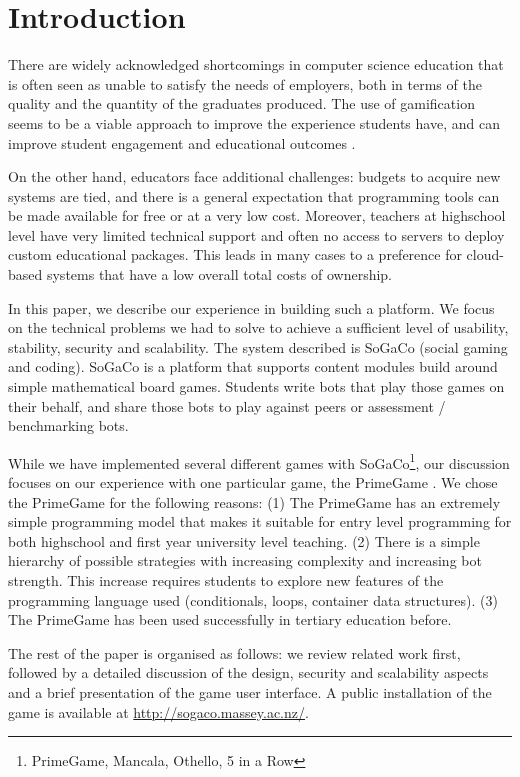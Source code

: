 \section{Introduction}


There are widely acknowledged shortcomings in computer science education that is often seen as unable to satisfy the needs of employers, both in terms of the quality and the quantity of the graduates produced. The use of gamification seems to be a viable approach to improve the experience students have, and can improve student engagement and educational outcomes \cite{muratet2009towards,rankin2008impact,wang2009application}.

On the other hand, educators face additional challenges: budgets to acquire new systems are tied, and there is a general expectation that programming tools can be made available for free or at a very low cost. Moreover, teachers at highschool level have very limited technical support and often no access to servers to deploy custom educational packages. This leads in many cases to a preference for cloud-based systems that have a low overall total costs of ownership.

In this paper,
we describe our experience in building such a platform. We focus on the technical problems we had to solve to achieve a sufficient level of usability, stability, security and scalability. The system described is SoGaCo (social gaming and coding). SoGaCo is a platform that supports content modules build around simple mathematical board games. Students write bots that play those games on their behalf, and share those bots to play against peers or assessment / benchmarking bots.

While we have implemented several different games with SoGaCo\footnote{PrimeGame, Mancala, Othello, 5 in a Row}, our discussion focuses on our experience with one particular game, the PrimeGame \cite{meyer2010primegame,meyer2011primegame}. We chose the PrimeGame for the following reasons: (1) The PrimeGame has an extremely simple programming model that makes it suitable for entry level programming for both highschool and first year university level teaching. (2) There is a simple hierarchy of possible strategies with increasing complexity and increasing bot strength. This increase requires students to explore new features of the programming language used (conditionals, loops, container data structures). (3) The PrimeGame has been used successfully in tertiary education before.


The rest of the paper is organised as follows: we review related work first, followed by a detailed discussion of the design, security and scalability aspects and a brief presentation of the game user interface. A public installation of the game is available at \url{http://sogaco.massey.ac.nz/}.